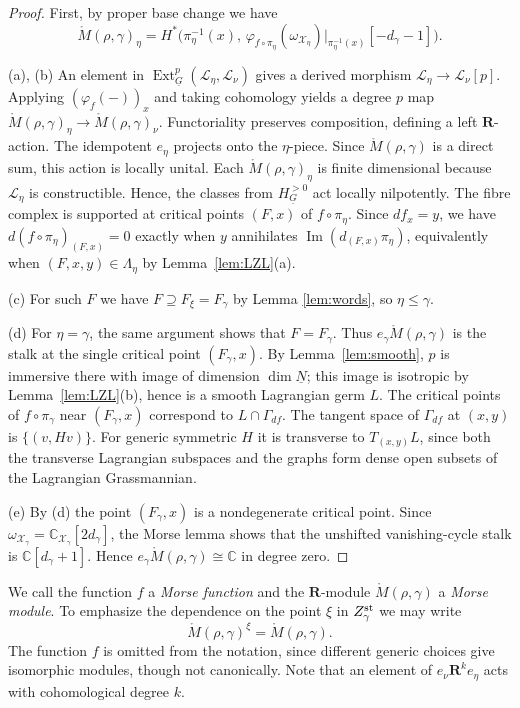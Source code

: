 \documentclass[11pt,reqno]{amsart}
\theoremstyle{definition}
\theoremstyle{remark}
\def\bbC{\mathbb C}
\def\dN{\underline N}
\def\dG{\underline G}
\def\scrX{\mathscr X}
\def\bR{\mathbf R}
\begin{document}
\begin{proof}
First, by proper base change we have
\[
\mathring M(\rho,\gamma)_\eta
 =H^*\bigl(\pi_\eta^{-1}(x),\,
 \varphi_{f\circ\pi_\eta}(\omega_{\scrX_\eta})
 |_{\pi_\eta^{-1}(x)}[-d_\gamma-1]\bigr).
\]

(a), (b) An element in
$\operatorname{Ext}_{\dG}^p(\mathscr L_\eta,\mathscr L_\nu)$ gives a derived
morphism $\mathscr L_\eta\to\mathscr L_\nu[p]$. Applying
$(\varphi_f(-))_x$ and taking cohomology yields a degree $p$ map
$\mathring M(\rho,\gamma)_\eta\to\mathring M(\rho,\gamma)_\nu$.
Functoriality preserves composition, defining a left $\bR$-action.
The idempotent $e_\eta$ projects onto the $\eta$-piece.
Since
$\mathring M(\rho,\gamma)$ is a direct sum, this action is locally unital.
Each $\mathring M(\rho,\gamma)_\eta$ is finite dimensional because $\mathscr L_\eta$ is
constructible. Hence, the classes from $H^{>0}_{\dG}$ act
locally nilpotently. 
The fibre complex is supported at critical points $(F,x)$ of
$f\circ\pi_\eta$. Since $df_x=y$, we have
$d(f\circ\pi_\eta)_{(F,x)}=0$ exactly when $y$ annihilates
$\operatorname{Im}(d_{(F,x)}\pi_\eta)$, equivalently when
$(F,x,y)\in\Lambda_\eta$ by Lemma~\ref{lem:LZL}(a).

(c) For such $F$ we have $F\supseteq F_\xi=F_\gamma$ by Lemma \ref{lem:words}, so $\eta\leqslant\gamma$.

(d) For $\eta=\gamma$, the same argument shows that $F=F_\gamma$.
Thus  $e_\gamma \mathring M(\rho,\gamma)$ is the stalk at the single critical point $(F_\gamma,x)$. By Lemma~\ref{lem:smooth}, $p$ is immersive there with image of
dimension $\dim\dN$; this image is isotropic by Lemma~\ref{lem:LZL}(b),
hence is a smooth Lagrangian germ $L$.
The critical points of $f\circ\pi_\gamma$ near $(F_\gamma,x)$ correspond to $L\cap\Gamma_{df}$.
The tangent space of $\Gamma_{df}$ at $(x,y)$ is $\{(v,Hv)\}$.
For generic symmetric $H$ it is transverse to $T_{(x,y)}L$, since both the transverse Lagrangian subspaces and
the graphs form dense open subsets of the Lagrangian Grassmannian. 

(e) By (d) the point $(F_\gamma,x)$ is a nondegenerate critical point.
Since $\omega_{\scrX_\gamma}=\bbC_{\scrX_\gamma}[2d_\gamma]$,
the Morse lemma shows that the unshifted vanishing-cycle
stalk is $\bbC[d_\gamma+1]$. Hence
$e_\gamma\mathring M(\rho,\gamma)\cong\bbC$ in degree zero. 
\end{proof}

We call the function $f$ a \emph{Morse function} and the $\mathbf R$-module $\mathring M(\rho,\gamma)$ a \emph{Morse module}.
To emphasize the dependence on the point $\xi$ in $Z_\gamma^{\rm st}$ we may write
$$\mathring M(\rho,\gamma)^\xi=\mathring M(\rho,\gamma).$$
The function $f$ is omitted from the notation, since different generic choices give isomorphic modules, 
though not canonically.
Note that an element of
$e_\nu\bR^k e_\eta$ acts with cohomological degree $k$.
\end{document}
